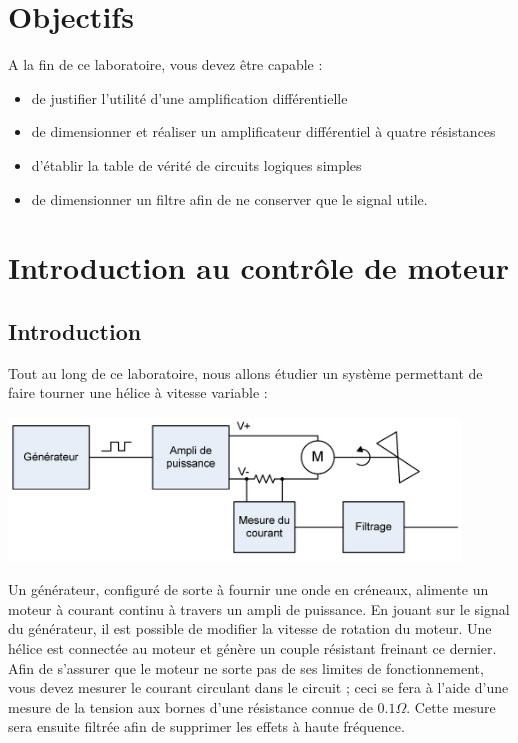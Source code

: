 \documentclass{../template/labo}
\begin{document}
\section{Objectifs}
A la fin de ce laboratoire, vous devez être capable :

\begin{itemize}
\item de justifier l'utilité d'une amplification différentielle
\item de dimensionner et réaliser un amplificateur différentiel à quatre résistances
\item d'établir la table de vérité de circuits logiques simples
\item de dimensionner un filtre afin de ne conserver que le signal utile.
\end{itemize}

\section{Introduction au contrôle de moteur}
\subsection{Introduction}

Tout au long de ce laboratoire, nous allons étudier un système permettant de faire tourner une hélice à
vitesse variable :

\begin{center}
\includegraphics[width=12cm]{sch1}
\end{center}

Un générateur, configuré de sorte à fournir une onde en créneaux, alimente un moteur à courant
continu à travers un ampli de puissance. En jouant sur le signal du générateur, il est
possible de modifier la vitesse de rotation du moteur.
Une hélice est connectée au moteur et génère un couple résistant freinant ce dernier.
Afin de s'assurer que le moteur ne sorte pas de ses limites de fonctionnement, vous devez
mesurer le courant circulant dans le circuit ; ceci se fera à l'aide d'une mesure de la
tension aux bornes d'une résistance connue de $0.1\Omega$. Cette mesure sera ensuite filtrée
afin de supprimer les effets à haute fréquence.
\end{document}
